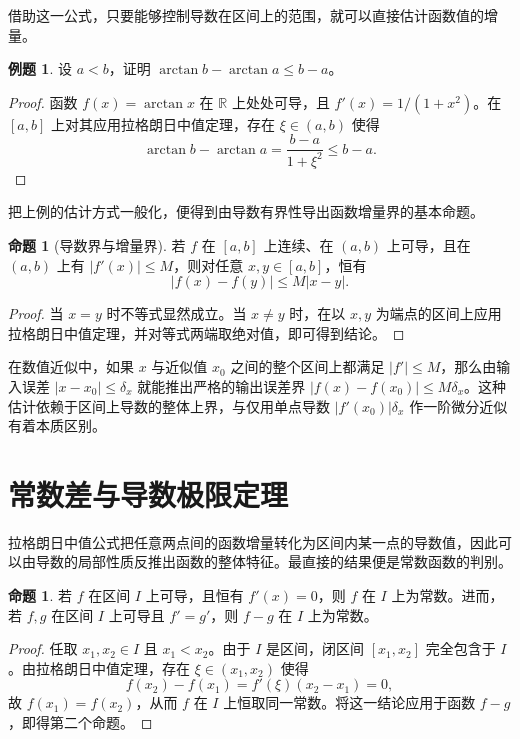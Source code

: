 \documentclass[UTF8,fontset=fandol,a4paper,12pt]{ctexart}
\newcommand{\R}{\mathbb R}
\theoremstyle{definition}
\newtheorem{proposition}[theorem]{命题}
\newtheorem{example}[theorem]{例题}
\begin{document}
借助这一公式，只要能够控制导数在区间上的范围，就可以直接估计函数值的增量。

\begin{example}
设 $a<b$，证明 $\arctan b-\arctan a\le b-a$。
\end{example}

\begin{proof}
函数 $f(x)=\arctan x$ 在 $\R$ 上处处可导，且 $f'(x)=1/(1+x^2)$。在 $[a,b]$ 上对其应用拉格朗日中值定理，存在 $\xi\in(a,b)$ 使得
\[
 \arctan b-\arctan a=\frac{b-a}{1+\xi^2}\le b-a.
\]
\end{proof}

把上例的估计方式一般化，便得到由导数有界性导出函数增量界的基本命题。

\begin{proposition}[导数界与增量界]
若 $f$ 在 $[a,b]$ 上连续、在 $(a,b)$ 上可导，且在 $(a,b)$ 上有 $|f'(x)|\le M$，则对任意 $x,y\in[a,b]$，恒有
\[
 |f(x)-f(y)|\le M|x-y|.
\]
\end{proposition}

\begin{proof}
当 $x=y$ 时不等式显然成立。当 $x\ne y$ 时，在以 $x,y$ 为端点的区间上应用拉格朗日中值定理，并对等式两端取绝对值，即可得到结论。
\end{proof}

在数值近似中，如果 $x$ 与近似值 $x_0$ 之间的整个区间上都满足 $|f'|\le M$，那么由输入误差 $|x-x_0|\le\delta_x$ 就能推出严格的输出误差界 $|f(x)-f(x_0)|\le M\delta_x$。这种估计依赖于区间上导数的整体上界，与仅用单点导数 $|f'(x_0)|\delta_x$ 作一阶微分近似有着本质区别。

\section{常数差与导数极限定理}
拉格朗日中值公式把任意两点间的函数增量转化为区间内某一点的导数值，因此可以由导数的局部性质反推出函数的整体特征。最直接的结果便是常数函数的判别。

\begin{proposition}
若 $f$ 在区间 $I$ 上可导，且恒有 $f'(x)=0$，则 $f$ 在 $I$ 上为常数。进而，若 $f,g$ 在区间 $I$ 上可导且 $f'=g'$，则 $f-g$ 在 $I$ 上为常数。
\end{proposition}

\begin{proof}
任取 $x_1,x_2\in I$ 且 $x_1<x_2$。由于 $I$ 是区间，闭区间 $[x_1,x_2]$ 完全包含于 $I$。由拉格朗日中值定理，存在 $\xi\in(x_1,x_2)$ 使得
\[
 f(x_2)-f(x_1)=f'(\xi)(x_2-x_1)=0,
\]
故 $f(x_1)=f(x_2)$，从而 $f$ 在 $I$ 上恒取同一常数。将这一结论应用于函数 $f-g$，即得第二个命题。
\end{proof}
\end{document}
